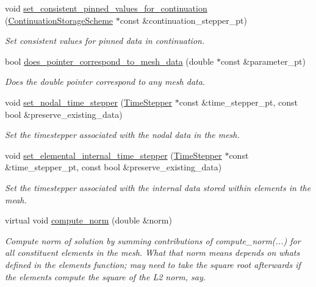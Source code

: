 \begin{DoxyCompactItemize}
void \hyperlink{classoomph_1_1Mesh_ac8d6a5dcf3af2df66625079975d84c19}{set\+\_\+consistent\+\_\+pinned\+\_\+values\+\_\+for\+\_\+continuation} (\hyperlink{classoomph_1_1ContinuationStorageScheme}{Continuation\+Storage\+Scheme} $\ast$const \&continuation\+\_\+stepper\+\_\+pt)
\begin{DoxyCompactList}\small\item\em Set consistent values for pinned data in continuation. \end{DoxyCompactList}\item 
bool \hyperlink{classoomph_1_1Mesh_a13712b3fb8f01107772db51e01dbeee0}{does\+\_\+pointer\+\_\+correspond\+\_\+to\+\_\+mesh\+\_\+data} (double $\ast$const \&parameter\+\_\+pt)
\begin{DoxyCompactList}\small\item\em Does the double pointer correspond to any mesh data. \end{DoxyCompactList}\item 
void \hyperlink{classoomph_1_1Mesh_ac40c947d8ffe5b14aa6ac77fc398f3ec}{set\+\_\+nodal\+\_\+time\+\_\+stepper} (\hyperlink{classoomph_1_1TimeStepper}{Time\+Stepper} $\ast$const \&time\+\_\+stepper\+\_\+pt, const bool \&preserve\+\_\+existing\+\_\+data)
\begin{DoxyCompactList}\small\item\em Set the timestepper associated with the nodal data in the mesh. \end{DoxyCompactList}\item 
void \hyperlink{classoomph_1_1Mesh_a681b7531f2c90ea88c8a5ff4df7bce59}{set\+\_\+elemental\+\_\+internal\+\_\+time\+\_\+stepper} (\hyperlink{classoomph_1_1TimeStepper}{Time\+Stepper} $\ast$const \&time\+\_\+stepper\+\_\+pt, const bool \&preserve\+\_\+existing\+\_\+data)
\begin{DoxyCompactList}\small\item\em Set the timestepper associated with the internal data stored within elements in the meah. \end{DoxyCompactList}\item 
virtual void \hyperlink{classoomph_1_1Mesh_a36ceaaaa59093ae61393a3fd9090469e}{compute\+\_\+norm} (double \&norm)
\begin{DoxyCompactList}\small\item\em Compute norm of solution by summing contributions of compute\+\_\+norm(...) for all constituent elements in the mesh. What that norm means depends on what\textquotesingle{}s defined in the element\textquotesingle{}s function; may need to take the square root afterwards if the elements compute the square of the L2 norm, say. \end{DoxyCompactList}\item 

\end{DoxyCompactItemize}
